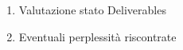 \begin{enumerate}
    \item Valutazione stato Deliverables
    \item Eventuali perplessità riscontrate
\end{enumerate}